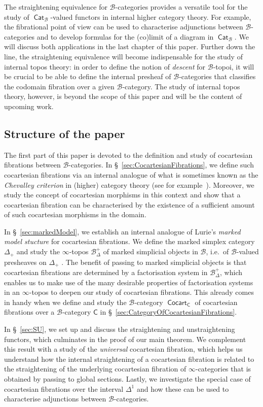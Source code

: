 \documentclass[reqno]{amsart}
\numberwithin{equation}{subsection}
\theoremstyle{plain}
\theoremstyle{definition}
\let\scr=\mathcal
\def\BB{\scr B}
\DeclareMathOperator{\ICat}{\mathsf{Cat}}
\DeclareMathOperator{\ICocart}{\mathsf{Cocart}}
\newcommand{\I}[1]{\mathsf{#1}}
\newcommand{\mSimp}[1]{#1_{\Delta}^+}
\begin{document}
The straightening equivalence for $\BB$-categories provides a versatile tool for the study of $\ICat_{\BB}$-valued functors in internal higher category theory. For example, the fibrational point of view can be used to characterise adjunctions between $\BB$-categories and to develop formulas for the (co)limit of a diagram in $\ICat_{\BB}$. We will discuss both applications in the last chapter of this paper. Further down the line, the straightening equivalence will become indispensable for the study of internal topos theory: in order to define the notion of \emph{descent} for $\BB$-topoi, it will be crucial to be able to define the internal presheaf of $\BB$-categories that classifies the codomain fibration over a given $\BB$-category. The study of internal topos theory, however, is beyond the scope of this paper and will be the content of upcoming work.

\subsection*{Structure of the paper}
The first part of this paper is devoted to the definition and study of cocartesian fibrations between $\BB$-categories. In \S~\ref{sec:CocartesianFibrations}, we define such cocartesian fibrations via an internal analogue of what is sometimes known as the \emph{Chevalley criterion} in (higher) category theory (see for example~\cite[Theorem~5.2.8]{Riehl2022}). Moreover, we study the concept of cocartesian morphisms in this context and show that a cocartesian fibration can be characterised by the existence of a sufficient amount of such cocartesian morphisms in the domain.

In \S~\ref{sec:markedModel}, we establish an internal analogue of Lurie's \emph{marked model stucture} for cocartesian fibrations. We define the marked simplex category $\Delta_+$ and study the $\infty$-topos $\mSimp\BB$ of marked simplicial objects in $\BB$, i.e.\ of $\BB$-valued presheaves on $\Delta_+$ . The benefit of passing to marked simplicial objects is that cocartesian fibrations are determined by a factorisation system in $\mSimp\BB$, which enables us to make use of the many desirable properties of factorisation systems in an $\infty$-topos to deepen our study of cocartesian fibrations. This already comes in handy when we define and study the $\BB$-category $\ICocart_{\I{C}}$ of cocartesian fibrations over a $\BB$-category $\I{C}$ in \S~\ref{sec:CategoryOfCocartesianFibrations}.

In \S~\ref{sec:SU}, we set up and discuss the straightening and unstraightening functors, which culminates in the proof of our main theorem. We complement this result with a study of the \emph{universal} cocartesian fibration, which helps us understand how the internal straightening of a cocartesian fibration is related to the straightening of the underlying cocartesian fibration of $\infty$-categories that is obtained by passing to global sections. Lastly, we investigate the special case of cocartesian fibrations over the interval $\Delta^1$ and how these can be used to characterise adjunctions between $\BB$-categories.
\end{document}
